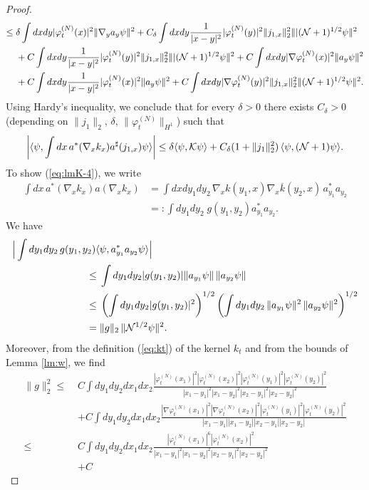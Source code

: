 \documentclass[11pt,a4paper]{article}
\newcommand{\done}{}
\newcommand{\cK}{{\cal K}}
\newcommand{\cN}{{\cal N}}
\begin{document}
\begin{proof}
\[\begin{split}
\leq \; &\delta \int dx dy |\varphi_t^{(N)} (x)|^2 \| \nabla_y a_y \psi \|^2 + C_\delta \int dx dy \frac{1}{|x-y|^2} |\varphi^{(N)}_t (y)|^2 \|j_{1,x}\|_2^2 \| |(\cN+1)^{1/2} \psi \|^2 \\ &
+C \int dx dy \frac{1}{|x-y|^2} |\varphi^{(N)}_t (y)|^2 \|j_{1,x}\|_2^2 \| |(\cN+1)^{1/2} \psi \|^2 + 
C \int dx dy | \nabla \varphi_t^{(N)} (x)|^2 \| a_y \psi \|^2 \\
&+C\int dx dy \frac{1}{|x-y|^2} |\varphi_t^{(N)} (x)|^2 \| a_y \psi \|^2 
+ C \int dx dy |\nabla \varphi_t^{(N)} (y)|^2  \|j_{1,x} \|_2^2 \|
(\cN+1)^{1/2} \psi \|^2. \end{split} \]
Using Hardy's inequality, we conclude that for every $\delta >0$ there exists $C_\delta > 0$ (depending on $ \| j_1 \|_2$, $\delta$, $\| \varphi_t^{(N)} \|_{H^1}$) such that 
\[ \left| \langle \psi , \int dx\, a^* (\nabla_x k_x) a^\sharp (j_{1,x}) \psi \rangle \right| \leq \delta \langle \psi , \cK \psi \rangle + C_\delta (1+  \| j_1 \|_2^2 ) \, \langle \psi , (\cN + 1) \psi \rangle. \]
To show (\ref{eq:lmK-4}), we write
\[  \begin{split} \int dx  \, a^* (\nabla_x k_x) a (\nabla_x k_x) & = \int dx dy_1 dy_2 \, \nabla_x k (y_1,x) \nabla_x \overline{k} (y_2,x) \, a_{y_1}^* a_{y_2} \\ & =: \int dy_1 dy_2 \; g (y_1, y_2) a_{y_1}^* a_{y_2}. \end{split} \]
We have\done
\[ \begin{split} \Big| \int dy_1 dy_2\, g (y_1 , y_2) \langle &\psi , a_{y_1}^* a_{y_2} \psi \rangle \Big| \\ \leq \; & \int dy_1 dy_2 |g (y_1 , y_2)| \| a_{y_1} \psi \| \, \|  a_{y_2} \psi \| \\ \leq  \; & \left(\int dy_1 dy_2 |g (y_1 , y_2)|^2 \right)^{1/2}  \left( \int dy_1 dy_2 \, \| a_{y_1} \psi \|^2 \, \|  a_{y_2} \psi \|^2 \right)^{1/2} \\ = \; & \| g \|_2 \, \| \cN^{1/2} \psi \|^2. \end{split} \] 
Moreover, from the definition (\ref{eq:kt}) of the kernel $k_t$ and from the bounds of Lemma \ref{lm:w}, we find\done 
\[ \begin{split} \| g \|_2^2 \leq \; &C \int dy_1 dy_2 dx_1 dx_2  \frac{|\varphi_t^{(N)} (x_1)|^2 |\varphi_t^{(N)} (x_2)|^2 |\varphi_t^{(N)} (y_1)|^2 |\varphi_t^{(N)} (y_2)|^2}{|x_1 - y_1|^2 |x_1 - y_2|^2 |x_2-y_1|^2 |x_2 - y_2|^2}  \\ &+C \int dy_1 dy_2 dx_1 dx_2 \frac{|\nabla \varphi_t^{(N)} (x_1)|^2 |\nabla \varphi_t^{(N)} (x_2)|^2 |\varphi_t^{(N)} (y_1)|^2 |\varphi_t^{(N)} (y_2)|^2}{|x_1 - y_1| |x_1 - y_2| |x_2-y_1| |x_2 - y_2|} \\  \leq \;& C \int dy_1 dy_2 dx_1 dx_2  \frac{|\varphi_t^{(N)} (x_1)|^6 |\varphi_t^{(N)} (x_2)|^2}{|x_1 - y_1|^2 |x_1 - y_2|^2 |x_2-y_1|^2 |x_2 - y_2|^2} \\ &+C 

\end{split}\]
\end{proof}
\end{document}

